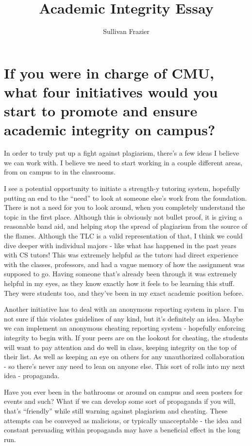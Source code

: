 \documentclass[12pt]{article} %
\title{Academic Integrity Essay}
\author{Sullivan Frazier}
\begin{document}
\maketitle

\section{If you were in charge of CMU, what four initiatives would you start to promote and ensure academic integrity on campus?}

\tab

	In order to truly put up a fight against plagiarism, there’s a few ideas I believe we can work with. I believe we need to start working in a couple different areas, from on campus to in the classrooms. 

I see a potential opportunity to initiate a strength-y tutoring system, hopefully putting an end to the “need” to look at someone else’s work from the foundation.  There is not a need for you to look around, when you completely understand the topic in the first place. Although this is obviously not bullet proof, it is giving a reasonable band aid, and helping stop the spread of plagiarism from the source of the flames. Although the TLC is a valid representation of that, I think we could dive deeper with individual majors - like what has happened in the past years with CS tutors! This was extremely helpful as the tutors had direct experience with the classes, professors, and had a vague memory of how the assignment was supposed to go. Having someone that’s already been through it was extremely helpful in my eyes, as they know exactly how it feels to be learning this stuff. They were students too, and they’ve been in my exact academic position before.

Another initiative has to deal with an anonymous reporting system in place. I’m not sure if this violates guidelines of any kind, but it’s definitely an idea. Maybe we can implement an anonymous cheating reporting system - hopefully enforcing integrity to begin with. If your peers are on the lookout for cheating, the students will want to pay attention and do well in class, keeping integrity on the top of their list. As well as keeping an eye on others for any unauthorized collaboration -  so there’s never any need to lean on anyone else. This sort of rolls into my next idea - propaganda. 

Have you ever been in the bathrooms or around on campus and seen posters for events and such? What if we can develop some sort of propaganda if you will, that’s “friendly” while still warning against plagiarism and cheating. These attempts can be conveyed as malicious, or typically unacceptable - the idea and constant persuading within propaganda may have a beneficial effect in the long run. 
\end{document}
